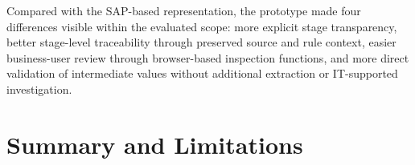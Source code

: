 Compared with the SAP-based representation, the prototype made four differences visible within the evaluated scope: more explicit stage transparency, better stage-level traceability through preserved source and rule context, easier business-user review through browser-based inspection functions, and more direct validation of intermediate values without additional extraction or IT-supported investigation.











\section{Summary and Limitations}

